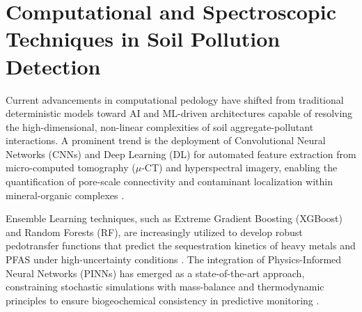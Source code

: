 \documentclass[environments,article,submit,pdftex,moreauthors]{Definitions/mdpi}
\begin{document}
\section{Computational and Spectroscopic Techniques in Soil Pollution
    Detection}\label{sec3}

Current advancements in computational pedology have shifted from traditional
deterministic models toward AI and ML-driven architectures capable of
resolving the high-dimensional, non-linear complexities of soil
aggregate-pollutant interactions. A prominent trend is the deployment of
Convolutional Neural Networks (CNNs) and Deep Learning (DL) for automated
feature extraction from micro-computed tomography ($\mu$-CT) and hyperspectral
imagery, enabling the quantification of pore-scale connectivity and contaminant
localization within mineral-organic complexes \cite{Demiral2026}.

Ensemble Learning techniques, such as Extreme Gradient Boosting (XGBoost) and
Random Forests (RF), are increasingly utilized to develop robust pedotransfer
functions that predict the sequestration kinetics of heavy metals and PFAS
under high-uncertainty conditions \cite{Sahab2025,Wadoux2024}. The integration
of Physics-Informed Neural Networks (PINNs) has emerged as a state-of-the-art
approach, constraining stochastic simulations with mass-balance and
thermodynamic principles to ensure biogeochemical consistency in predictive
monitoring \cite{Xuetall2025}.
\end{document}
